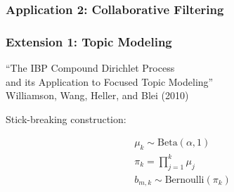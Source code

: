 \documentclass[13pt]{beamer}
\begin{document}
\begin{frame}
\frametitle{Application 2: Collaborative Filtering}
\end{frame}
\begin{frame}
\frametitle{Extension 1: Topic Modeling}

\begin{center}
``The IBP Compound Dirichlet Process \\
and its Application to Focused Topic Modeling'' \\
Williamson, Wang, Heller, and Blei (2010)
\end{center}

Stick-breaking construction:

\begin{eqnarray*}
\mu_k \sim \text{Beta}(\alpha, 1) \\
\pi_k = \prod_{j=1}^k \mu_j \\
b_{m,k} \sim \text{Bernoulli}(\pi_k) 
\end{eqnarray*}


\end{frame}
\end{document}

